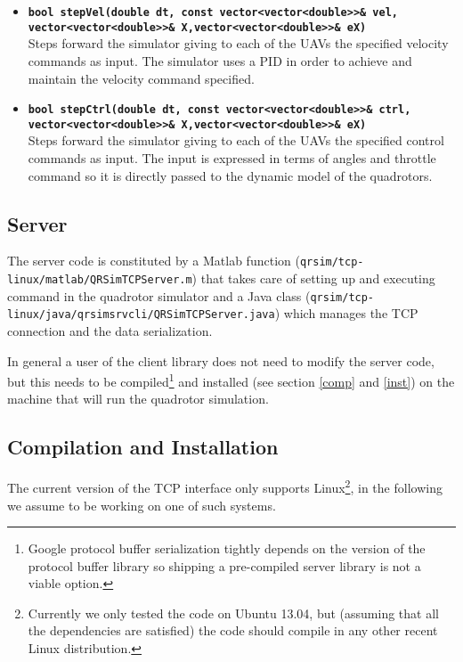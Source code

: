 \documentclass[a4paper,11pt]{report}
\begin{document}
\begin{itemize}
\item \textbf{\texttt{bool stepVel(double dt, const vector<vector<double>>\& vel,\\ \hspace*{72pt} vector<vector<double>>\& X,vector<vector<double>>\& eX)}}\\
Steps forward the simulator giving to each of the UAVs the specified velocity commands as input.
The simulator uses a PID in order to achieve and maintain the velocity command specified.

\item \textbf{\texttt{bool stepCtrl(double dt, const vector<vector<double>>\& ctrl,\\ \hspace*{80pt} vector<vector<double>>\& X,vector<vector<double>>\& eX)}}\\
Steps forward the simulator giving to each of the UAVs the specified control commands as input.
The input is expressed in terms of angles and throttle command so it is directly passed to the dynamic model of the quadrotors.

\end{itemize}

\subsection{Server}
The server code is constituted by a Matlab function (\texttt{qrsim/tcp-linux/matlab/QRSimTCPServer.m}) that takes care of setting up and executing command in the quadrotor simulator and a Java class (\texttt{qrsim/tcp-linux/java/qrsimsrvcli/QRSimTCPServer.java}) which manages the TCP connection and the data serialization.

In general a user of the client library does not need to modify the server code, but this needs to be compiled\footnote{Google protocol buffer serialization tightly depends on the version of the protocol buffer library so shipping a pre-compiled server library is not a viable option.} and installed (see section \ref{comp} and \ref{inst}) on the machine that will run the quadrotor simulation.

\subsection{Compilation and Installation}

The current version of the TCP interface only supports Linux\footnote{Currently we only tested the code on Ubuntu 13.04, but (assuming that all the dependencies are satisfied) the code should compile in any other recent Linux distribution.}, in the following we assume to be working on one of such systems.
\end{document}
